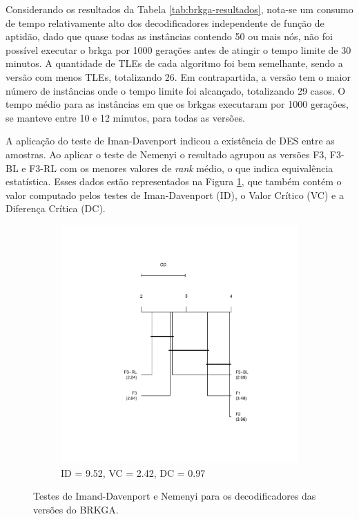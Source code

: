 Considerando  os resultados  da  Tabela  \ref{tab:brkga-resultados}, nota-se  um
consumo de tempo  relativamente alto dos decodificadores  independente de função
de aptidão, dado que quase todas as  instâncias contendo 50 ou mais nós, não foi
possível  executar o  \gls{brkga} por  1000 gerações  antes de  atingir o  tempo
limite de 30 minutos. A quantidade de TLEs de cada algoritmo foi bem semelhante,
sendo  {\bfum} a  versão com  menos TLEs,  totalizando 26.  Em contrapartida,  a
versão  {\bfdois} tem  o maior  número  de instâncias  onde o  tempo limite  foi
alcançado, totalizando  29 casos.  O tempo  médio para as  instâncias em  que os
\gls{brkga}s executaram  por 1000 gerações,  se manteve  entre 10 e  12 minutos,
para todas as versões.

A aplicação  do teste  de Iman-Davenport  indicou a existência  de DES  entre as
amostras. Ao aplicar o teste de Nemenyi o resultado agrupou as versões F3, F3-BL
e F3-RL com  os menores valores de  {\em rank} médio, o  que indica equivalência
estatística. Esses dados estão  representados na Figura \ref{fig:brkga-nemenyi},
que também contém o valor computado pelos testes de Iman-Davenport (ID), o Valor
Crítico (VC) e a Diferença Crítica (DC). \newline

\begin{figure}[!ht]
    \centering
    \begin{subfigure}{.5\textwidth}
        \centering
        \includegraphics[scale=0.6]{imagens/plot-id.pdf}
        \vspace*{-2cm}
        \caption{ID = 9.52, VC = 2.42, DC = 0.97}
    \end{subfigure}
    \caption{Testes de Imand-Davenport e Nemenyi para os
      decodificadores das versões do BRKGA.}
    \label{fig:brkga-nemenyi}
\end{figure}

